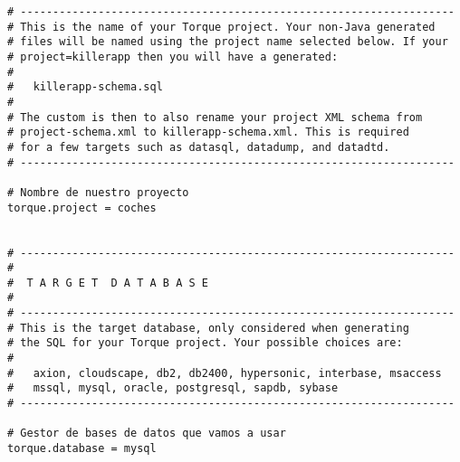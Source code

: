 \begin{lstlisting}
# -------------------------------------------------------------------
# This is the name of your Torque project. Your non-Java generated
# files will be named using the project name selected below. If your
# project=killerapp then you will have a generated:
#
#   killerapp-schema.sql
#
# The custom is then to also rename your project XML schema from
# project-schema.xml to killerapp-schema.xml. This is required
# for a few targets such as datasql, datadump, and datadtd.
# -------------------------------------------------------------------

# Nombre de nuestro proyecto
torque.project = coches


# -------------------------------------------------------------------
#
#  T A R G E T  D A T A B A S E
#
# -------------------------------------------------------------------
# This is the target database, only considered when generating
# the SQL for your Torque project. Your possible choices are:
#
#   axion, cloudscape, db2, db2400, hypersonic, interbase, msaccess
#   mssql, mysql, oracle, postgresql, sapdb, sybase
# -------------------------------------------------------------------

# Gestor de bases de datos que vamos a usar
torque.database = mysql



\end{lstlisting}
